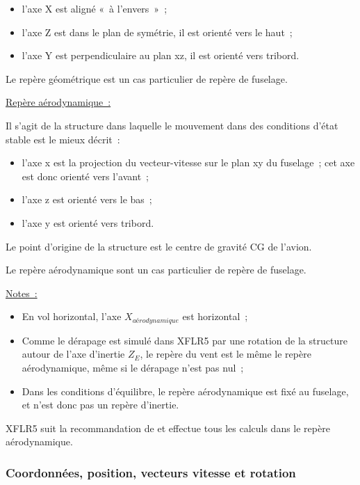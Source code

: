 \documentclass[a4paper,twoside,12pt,dvips]{article}
\begin{document}
\begin{itemize}
	\item l’axe X est aligné «~à l’envers~»~;
	\item l’axe Z est dans le plan de symétrie, il est orienté vers le haut~;
	\item l’axe Y est perpendiculaire au plan xz, il est orienté vers tribord.
\end{itemize}

Le repère géométrique est un cas particulier de repère de fuselage.

\underline{Repère aérodynamique~:}

Il s’agit de la structure dans laquelle le mouvement dans des conditions
d’état stable est le mieux décrit~:

\begin{itemize}
	\item l’axe x est la projection du vecteur-vitesse sur le plan xy du
	fuselage~; cet axe est donc orienté vers l’avant~;
	\item l’axe z est orienté vers le bas~;
	\item l’axe y est orienté vers tribord.
\end{itemize}

Le point d’origine de la structure est le centre de gravité CG de l’avion.

Le repère aérodynamique sont un cas particulier de repère de fuselage.

\underline{Notes~:}

\begin{itemize}
	\item En vol horizontal, l’axe $X_{aérodynamique}$ est horizontal~;
	\item Comme le dérapage est simulé dans XFLR5 par une rotation de la 
	structure autour de l’axe d’inertie $Z_E$, le repère du vent est le même le
	repère aérodynamique, même si le dérapage n’est pas nul~;
	\item Dans les conditions d’équilibre, le repère aérodynamique est fixé au
	fuselage, et n’est donc pas un repère d’inertie.
\end{itemize}

XFLR5 suit la recommandation de \cite{Etkin} et effectue tous les
calculs dans le repère aérodynamique.

\subsubsection{Coordonnées, position, vecteurs vitesse et rotation}
\end{document}
